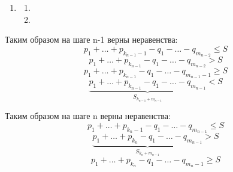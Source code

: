 \documentclass[book, 11pt]{report}
\begin{document}
{\begin{enumerate}
{\begin{enumerate}
                \item \par{}
            \end{enumerate}
            }
            \item \par{
            \begin{enumerate}
                \item \par{}
                \item \par{}
            \end{enumerate}
            }
        \end{enumerate}
        \par{\text{$\ldots$}}
        }
        \par{Таким образом на шаге n-1 верны неравенства:}
        \begin{equation*}
            p_1+\ldots+p_{k_{n-1}-1}-q_1-\ldots-q_{m_{n-2}}\leq S
        \end{equation*}
        \begin{equation*}
            p_1+\ldots+p_{k_{n-1}}-q_1-\ldots-q_{m_{n-2}} > S
        \end{equation*}
        \begin{equation}
            p_1+\ldots+p_{k_{n-1}}-q_1-\ldots-q_{m_{n-1}-1}\geq S
        \end{equation}
        \begin{equation}
            \underbrace{p_1+\ldots+p_{k_{n-1}}-q_1-\ldots-q_{m_{n-1}}}_{S_{k_{n-1}+m_{n-1}}}< S
        \end{equation}
        \par{Таким образом на шаге n верны неравенства:}
        \begin{equation}
            p_1+\ldots+p_{k_{n}-1}-q_1-\ldots-q_{m_{n-1}}\leq S
        \end{equation}
        \begin{equation}
            \underbrace{p_1+\ldots+p_{k_{n}}-q_1-\ldots-q_{m_{n-1}}}_{S_{k_{n}+m_{n-1}}} > S
        \end{equation}
        \begin{equation}
            p_1+\ldots+p_{k_{n}}-q_1-\ldots-q_{m_{n}-1}\geq S
        \end{equation}
\end{document}
